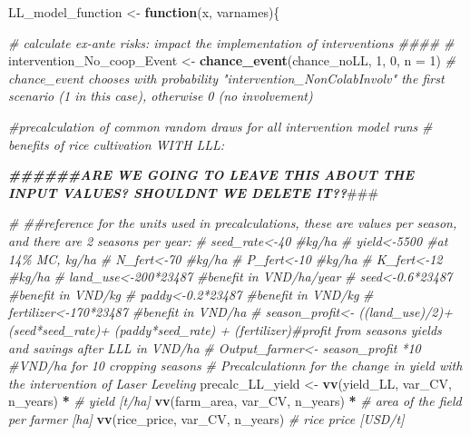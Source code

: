 \documentclass[
]{article}
\newenvironment{Shaded}{\begin{snugshade}}{\end{snugshade}}
\newcommand{\AlertTok}[1]{\textcolor[rgb]{0.94,0.16,0.16}{#1}}
\newcommand{\AttributeTok}[1]{\textcolor[rgb]{0.13,0.29,0.53}{#1}}
\newcommand{\CommentTok}[1]{\textcolor[rgb]{0.56,0.35,0.01}{\textit{#1}}}
\newcommand{\ControlFlowTok}[1]{\textcolor[rgb]{0.13,0.29,0.53}{\textbf{#1}}}
\newcommand{\DecValTok}[1]{\textcolor[rgb]{0.00,0.00,0.81}{#1}}
\newcommand{\DocumentationTok}[1]{\textcolor[rgb]{0.56,0.35,0.01}{\textbf{\textit{#1}}}}
\newcommand{\FunctionTok}[1]{\textcolor[rgb]{0.13,0.29,0.53}{\textbf{#1}}}
\newcommand{\NormalTok}[1]{#1}
\newcommand{\OtherTok}[1]{\textcolor[rgb]{0.56,0.35,0.01}{#1}}
\newcommand{\SpecialCharTok}[1]{\textcolor[rgb]{0.81,0.36,0.00}{\textbf{#1}}}
\begin{document}
\begin{Shaded}
\begin{Highlighting}[]
\NormalTok{LL\_model\_function }\OtherTok{\textless{}{-}} \ControlFlowTok{function}\NormalTok{(x, varnames)\{}
  
    \CommentTok{\# calculate ex{-}ante risks: impact the implementation of interventions \#\#\#\#}
  \CommentTok{\#}
\NormalTok{    intervention\_No\_coop\_Event }\OtherTok{\textless{}{-}} \FunctionTok{chance\_event}\NormalTok{(chance\_noLL, }\DecValTok{1}\NormalTok{, }\DecValTok{0}\NormalTok{, }\AttributeTok{n =} \DecValTok{1}\NormalTok{)}
  \CommentTok{\# chance\_event chooses with probability "intervention\_NonColabInvolv" the first scenario (1 in this case), otherwise 0 (no involvement)}
  
  \CommentTok{\#precalculation of common random draws for all intervention model runs}
  \CommentTok{\# benefits of rice cultivation WITH LLL:        }
    
\DocumentationTok{\#\#\#\#\#\#ARE WE GOING TO LEAVE THIS ABOUT THE INPUT VALUES? SHOULDNT WE DELETE IT??}\AlertTok{\#\#\#}

            \CommentTok{\# \#\#reference for the units used in precalculations, these are values per season, and there are 2 seasons per year:}
            \CommentTok{\# seed\_rate\textless{}{-}40 \#kg/ha}
            \CommentTok{\# yield\textless{}{-}5500 \#at 14\% MC, kg/ha}
            \CommentTok{\# N\_fert\textless{}{-}70 \#kg/ha}
            \CommentTok{\# P\_fert\textless{}{-}10 \#kg/ha}
            \CommentTok{\# K\_fert\textless{}{-}12 \#kg/ha}
            \CommentTok{\# land\_use\textless{}{-}200*23487 \#benefit in VND/ha/year}
            \CommentTok{\# seed\textless{}{-}0.6*23487 \#benefit in VND/kg}
            \CommentTok{\# paddy\textless{}{-}0.2*23487 \#benefit in VND/kg}
            \CommentTok{\# fertilizer\textless{}{-}170*23487 \#benefit in VND/ha}
            \CommentTok{\# season\_profit\textless{}{-} ((land\_use)/2)+(seed*seed\_rate)+ (paddy*seed\_rate) + (fertilizer)\#profit from season\textquotesingle{}s yields and savings after LLL in VND/ha}
            \CommentTok{\# Output\_farmer\textless{}{-} season\_profit *10 \#VND/ha for 10 cropping seasons                                      }
  \CommentTok{\# Precalculationn for the change in yield with the intervention of Laser Leveling}
\NormalTok{  precalc\_LL\_yield }\OtherTok{\textless{}{-}}
    \FunctionTok{vv}\NormalTok{(yield\_LL, var\_CV, n\_years) }\SpecialCharTok{*} \CommentTok{\# yield [t/ha]}
    \FunctionTok{vv}\NormalTok{(farm\_area, var\_CV, n\_years) }\SpecialCharTok{*} \CommentTok{\# area of the field per farmer [ha]}
    \FunctionTok{vv}\NormalTok{(rice\_price, var\_CV, n\_years) }\CommentTok{\# rice price [USD/t]}
  

\end{Highlighting}
\end{Shaded}
\end{document}

